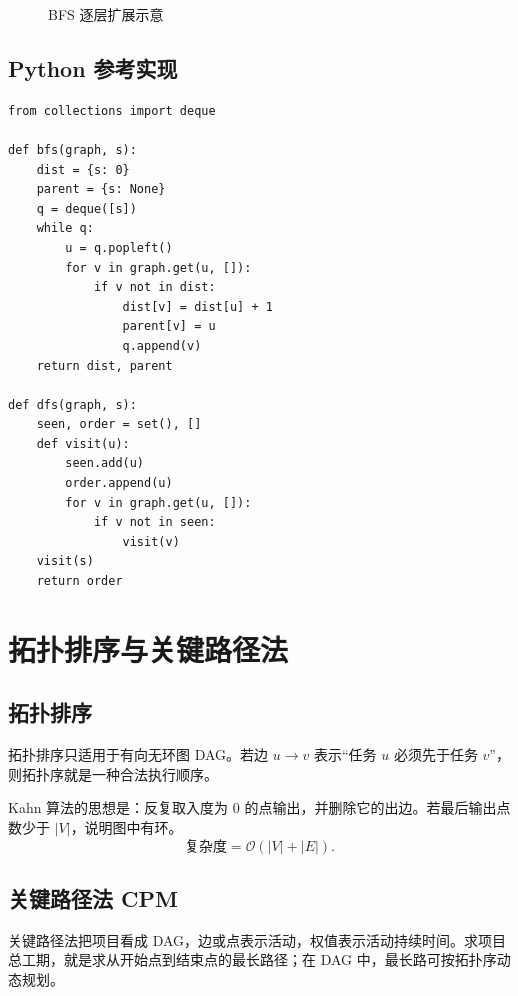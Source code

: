 \documentclass[UTF8,oneside,12pt]{ctexbook}
\newcommand{\bigO}{\mathcal O}
\begin{document}
\begin{figure}[htbp]
\centering
{}
\caption{BFS 逐层扩展示意}
\end{figure}

\subsection{Python 参考实现}
\begin{lstlisting}
from collections import deque

def bfs(graph, s):
    dist = {s: 0}
    parent = {s: None}
    q = deque([s])
    while q:
        u = q.popleft()
        for v in graph.get(u, []):
            if v not in dist:
                dist[v] = dist[u] + 1
                parent[v] = u
                q.append(v)
    return dist, parent

def dfs(graph, s):
    seen, order = set(), []
    def visit(u):
        seen.add(u)
        order.append(u)
        for v in graph.get(u, []):
            if v not in seen:
                visit(v)
    visit(s)
    return order
\end{lstlisting}

\section{拓扑排序与关键路径法}
\subsection{拓扑排序}
拓扑排序只适用于有向无环图 DAG。若边 $u\to v$ 表示“任务 $u$ 必须先于任务 $v$”，则拓扑序就是一种合法执行顺序。

Kahn 算法的思想是：反复取入度为 $0$ 的点输出，并删除它的出边。若最后输出点数少于 $|V|$，说明图中有环。
\[
\text{复杂度}=\bigO(|V|+|E|).
\]

\subsection{关键路径法 CPM}
关键路径法把项目看成 DAG，边或点表示活动，权值表示活动持续时间。求项目总工期，就是求从开始点到结束点的最长路径；在 DAG 中，最长路可按拓扑序动态规划。
\end{document}
